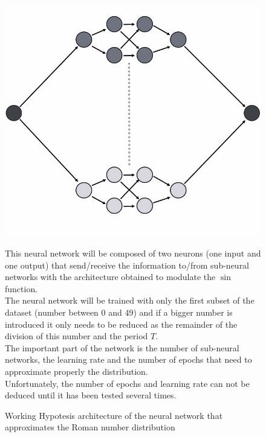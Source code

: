 \documentclass[a4paper, 11pt]{article}
\begin{document}
\begin{figure}[h]
    \begin{minipage}{5.5cm}
        \begin{center}
            \includegraphics[width = 1\linewidth]{Neural_Network/roman_architecture.jpg}
            \caption{Working Hypotesis architecture of the neural network that approximates the Roman number distribution}
            \label{roman-architecture}
        \end{center}
    \end{minipage}
    \hspace{1em}
    \begin{minipage}{9cm}
 This neural network will be composed of two neurons (one input and one output) that send/receive the information to/from sub-neural networks with the architecture obtained to modulate the $\sin$ function.\\
 The neural network will be trained with only the first subset of the dataset (number between 0 and 49) and if a bigger number is introduced it only needs to be reduced as the remainder of the division of this number and the period $T$.\\
 The important part of the network is the number of sub-neural networks, the learning rate and the number of epochs that need to approximate properly the distribution.\\
 Unfortunately, the number of epochs and learning rate can not be deduced until it has been tested several times.
    \end{minipage}
\end{figure}\\
\end{document}
